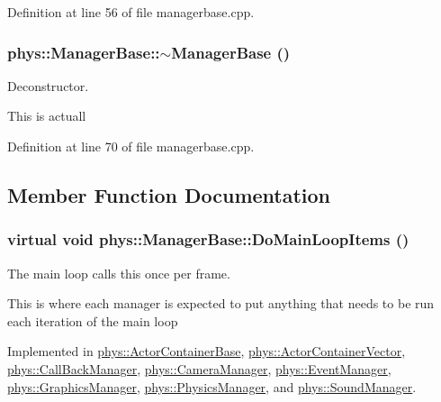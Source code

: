 Definition at line 56 of file managerbase.cpp.

\hypertarget{classphys_1_1ManagerBase_a802dace8381459637297e9a372bfdf0c}{
\subsubsection[{$\sim$ManagerBase}]{\setlength{\rightskip}{0pt plus 5cm}phys::ManagerBase::$\sim$ManagerBase ()}}
\label{d2/de3/classphys_1_1ManagerBase_a802dace8381459637297e9a372bfdf0c}


Deconstructor. 

This is actuall 

Definition at line 70 of file managerbase.cpp.



\subsection{Member Function Documentation}
\hypertarget{classphys_1_1ManagerBase_aa9e13a3f7c398b708f0f242610b5abf7}{
\subsubsection[{DoMainLoopItems}]{\setlength{\rightskip}{0pt plus 5cm}virtual void phys::ManagerBase::DoMainLoopItems ()}}
\label{d2/de3/classphys_1_1ManagerBase_aa9e13a3f7c398b708f0f242610b5abf7}


The main loop calls this once per frame. 

This is where each manager is expected to put anything that needs to be run each iteration of the main loop 

Implemented in \hyperlink{classphys_1_1ActorContainerBase_a67fbde6a61602253f66fecd0416bdc2f}{phys::ActorContainerBase}, \hyperlink{classphys_1_1ActorContainerVector_a883e59ac1674421bac143088a6cf07c8}{phys::ActorContainerVector}, \hyperlink{classphys_1_1CallBackManager_acaa942de1f6f8b42d06d981121d501e0}{phys::CallBackManager}, \hyperlink{classphys_1_1CameraManager_aaae22266bccc43f6efa66d2735d7d1d3}{phys::CameraManager}, \hyperlink{classphys_1_1EventManager_aca8fb3d285484dcdb943824bf11f3596}{phys::EventManager}, \hyperlink{classphys_1_1GraphicsManager_a72e5dc563c6947cded348f19d3df41ee}{phys::GraphicsManager}, \hyperlink{classphys_1_1PhysicsManager_a62741a2582ac9bfd0255cf8a3ad2310c}{phys::PhysicsManager}, and \hyperlink{classphys_1_1SoundManager_a577b228753ea19856b8476ab831e547e}{phys::SoundManager}.

